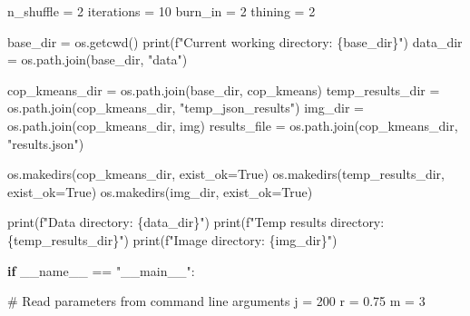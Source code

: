 \documentclass[
  letterpaper,
  DIV=11,
  numbers=noendperiod]{scrreprt}
\newenvironment{Shaded}{\begin{snugshade}}{\end{snugshade}}
\newcommand{\BuiltInTok}[1]{\textcolor[rgb]{0.00,0.23,0.31}{#1}}
\newcommand{\CommentTok}[1]{\textcolor[rgb]{0.37,0.37,0.37}{#1}}
\newcommand{\ControlFlowTok}[1]{\textcolor[rgb]{0.00,0.23,0.31}{\textbf{#1}}}
\newcommand{\DecValTok}[1]{\textcolor[rgb]{0.68,0.00,0.00}{#1}}
\newcommand{\FloatTok}[1]{\textcolor[rgb]{0.68,0.00,0.00}{#1}}
\newcommand{\NormalTok}[1]{\textcolor[rgb]{0.00,0.23,0.31}{#1}}
\newcommand{\OperatorTok}[1]{\textcolor[rgb]{0.37,0.37,0.37}{#1}}
\newcommand{\SpecialCharTok}[1]{\textcolor[rgb]{0.37,0.37,0.37}{#1}}
\newcommand{\SpecialStringTok}[1]{\textcolor[rgb]{0.13,0.47,0.30}{#1}}
\newcommand{\StringTok}[1]{\textcolor[rgb]{0.13,0.47,0.30}{#1}}
\newcommand{\VariableTok}[1]{\textcolor[rgb]{0.07,0.07,0.07}{#1}}
\begin{document}
\begin{Shaded}
\begin{Highlighting}[]
\NormalTok{n\_shuffle }\OperatorTok{=} \DecValTok{2}
\NormalTok{iterations }\OperatorTok{=} \DecValTok{10}
\NormalTok{burn\_in }\OperatorTok{=} \DecValTok{2}
\NormalTok{thining }\OperatorTok{=} \DecValTok{2}

\NormalTok{base\_dir }\OperatorTok{=}\NormalTok{ os.getcwd()}
\BuiltInTok{print}\NormalTok{(}\SpecialStringTok{f"Current working directory: }\SpecialCharTok{\{}\NormalTok{base\_dir}\SpecialCharTok{\}}\SpecialStringTok{"}\NormalTok{)}
\NormalTok{data\_dir }\OperatorTok{=}\NormalTok{ os.path.join(base\_dir, }\StringTok{"data"}\NormalTok{)}

\NormalTok{cop\_kmeans\_dir }\OperatorTok{=}\NormalTok{ os.path.join(base\_dir, }\StringTok{\textquotesingle{}cop\_kmeans\textquotesingle{}}\NormalTok{)}
\NormalTok{temp\_results\_dir }\OperatorTok{=}\NormalTok{ os.path.join(cop\_kmeans\_dir, }\StringTok{"temp\_json\_results"}\NormalTok{)}
\NormalTok{img\_dir }\OperatorTok{=}\NormalTok{ os.path.join(cop\_kmeans\_dir, }\StringTok{\textquotesingle{}img\textquotesingle{}}\NormalTok{)}
\NormalTok{results\_file }\OperatorTok{=}\NormalTok{ os.path.join(cop\_kmeans\_dir, }\StringTok{"results.json"}\NormalTok{)}

\NormalTok{os.makedirs(cop\_kmeans\_dir, exist\_ok}\OperatorTok{=}\VariableTok{True}\NormalTok{)}
\NormalTok{os.makedirs(temp\_results\_dir, exist\_ok}\OperatorTok{=}\VariableTok{True}\NormalTok{)}
\NormalTok{os.makedirs(img\_dir, exist\_ok}\OperatorTok{=}\VariableTok{True}\NormalTok{)}

\BuiltInTok{print}\NormalTok{(}\SpecialStringTok{f"Data directory: }\SpecialCharTok{\{}\NormalTok{data\_dir}\SpecialCharTok{\}}\SpecialStringTok{"}\NormalTok{)}
\BuiltInTok{print}\NormalTok{(}\SpecialStringTok{f"Temp results directory: }\SpecialCharTok{\{}\NormalTok{temp\_results\_dir}\SpecialCharTok{\}}\SpecialStringTok{"}\NormalTok{)}
\BuiltInTok{print}\NormalTok{(}\SpecialStringTok{f"Image directory: }\SpecialCharTok{\{}\NormalTok{img\_dir}\SpecialCharTok{\}}\SpecialStringTok{"}\NormalTok{)}

\ControlFlowTok{if} \VariableTok{\_\_name\_\_} \OperatorTok{==} \StringTok{"\_\_main\_\_"}\NormalTok{:}

    \CommentTok{\# Read parameters from command line arguments}
\NormalTok{    j }\OperatorTok{=} \DecValTok{200}
\NormalTok{    r }\OperatorTok{=} \FloatTok{0.75}
\NormalTok{    m }\OperatorTok{=} \DecValTok{3}


\end{Highlighting}
\end{Shaded}
\end{document}
